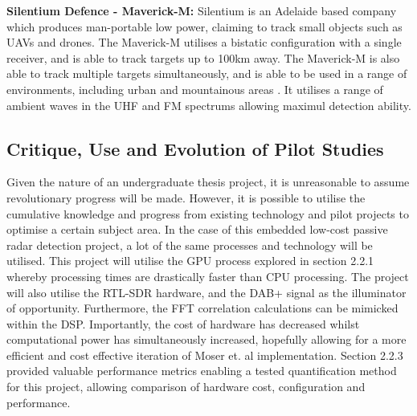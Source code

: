 \documentclass[12pt,a4paper]{article}
\begin{document}
\par \vspace{0.5cm} 
\noindent \textbf{Silentium Defence - Maverick-M:} Silentium is an Adelaide based company which produces man-portable low power, claiming to track small objects such as UAVs and drones. The Maverick-M utilises a bistatic configuration with a single receiver, and is able to track targets up to 100km away. The Maverick-M is also able to track multiple targets simultaneously, and is able to be used in a range of environments, including urban and mountainous areas \cite{Cilentium}. It utilises a range of ambient waves in the UHF and FM spectrums allowing maximul detection ability.

\subsection{Critique, Use and Evolution of Pilot Studies}
Given the nature of an undergraduate thesis project, it is unreasonable to assume revolutionary progress will be made. However, it is possible to utilise the cumulative knowledge and progress from existing technology and pilot projects to optimise a certain subject area. In the case of this embedded low-cost passive radar detection project, a lot of the same processes and technology will be utilised. This project will utilise the GPU process explored in section 2.2.1 whereby processing times are drastically faster than CPU processing. The project will also utilise the RTL-SDR hardware, and the DAB+ signal as the illuminator of opportunity. Furthermore, the FFT correlation calculations can be mimicked within the DSP. Importantly, the cost of hardware has decreased whilst computational power has simultaneously increased, hopefully allowing for a more efficient and cost effective iteration of Moser et. al implementation. Section 2.2.3 provided valuable performance metrics enabling a tested quantification method for this project, allowing comparison of hardware cost, configuration and performance. 
\end{document}
